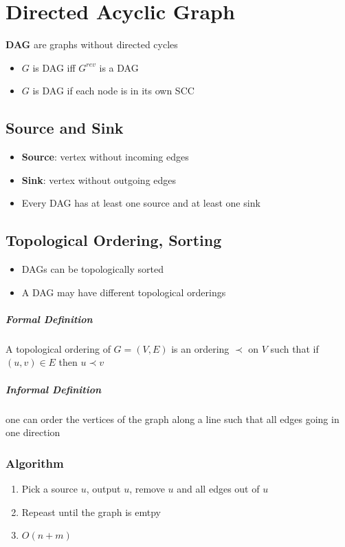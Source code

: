 \chapter{Directed Acyclic Graph}

\textbf{DAG} are graphs without directed cycles

\begin{itemize}
  \item $ G $ is DAG iff $ G^{rev} $ is a DAG
  \item $ G $ is DAG if each node is in its own SCC
\end{itemize}

\section{Source and Sink}

  \begin{itemize}
    \item \textbf{Source}: vertex without incoming edges
    \item \textbf{Sink}: vertex without outgoing edges
    \item Every DAG has at least one source and at least one sink
  \end{itemize}

\section{Topological Ordering, Sorting}

  \begin{itemize}
    \item DAGs can be topologically sorted
    \item A DAG may have different topological orderings
  \end{itemize}

  \paragraph{Formal Definition} A topological ordering of
  $ G = \left( V, E \right) $ is an ordering $ \prec $ on $ V $ such that
  if $ \left( u, v \right) \in E $ then $ u \prec v $

  \paragraph{Informal Definition} one can order the vertices of the graph
  along a line such that all edges going in one direction

  \subsection{Algorithm}

    \begin{enumerate}
      \item Pick a source $ u $, output $ u $, remove $ u $ and all edges
      out of $ u $
      \item Repeast until the graph is emtpy
      \item $ O\left( n + m \right) $
    \end{enumerate}
